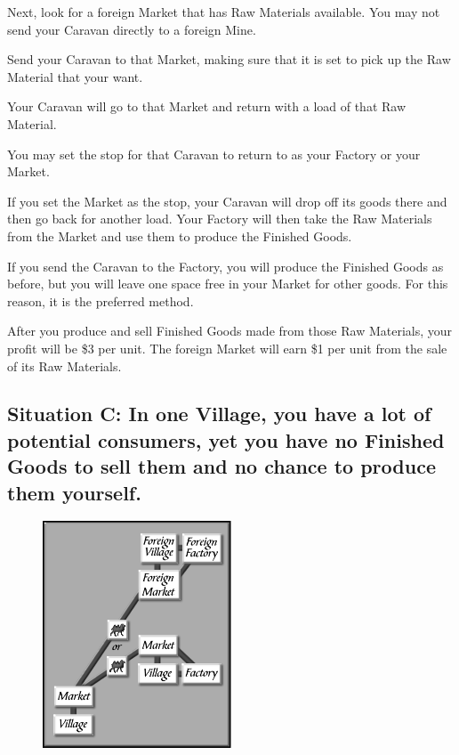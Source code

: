 Next, look for a foreign Market that has Raw Materials available. You may not send your Caravan directly to a foreign Mine.

Send your Caravan to that Market, making sure that it is set to pick up the Raw Material that your want.

Your Caravan will go to that Market and return with a load of that Raw Material.

You may set the stop for that Caravan to return to as your Factory or your Market.

If you set the Market as the stop, your Caravan will drop off its goods there and then go back for another load. Your Factory will then take the Raw Materials from the Market and use them to produce the Finished Goods.

If you send the Caravan to the Factory, you will produce the Finished Goods as before, but you will leave one space free in your Market for other goods. For this reason, it is the preferred method.

After you produce and sell Finished Goods made from those Raw Materials, your profit will be \$3 per unit. The foreign Market will earn \$1 per unit from the sale of its Raw Materials.

\subsection{\textsf{Situation C: In one Village, you have a lot of potential consumers, yet you have no Finished Goods to sell them and no chance to produce them yourself.}}

\begin{figure}
    \vspace{-20pt}
    \begin{center}
        \includegraphics[width=0.5\textwidth]{Itradesit3} %
    \end{center}
    \vspace{-20pt}
\end{figure}

